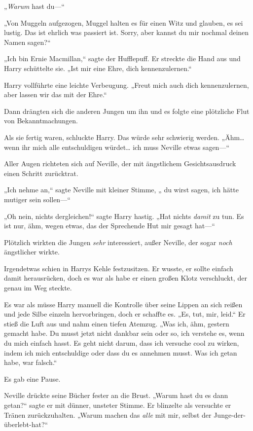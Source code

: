 {„\emph{Warum} hast du—“

„Von Muggeln aufgezogen, Muggel halten es für einen Witz und glauben, es sei lustig. Das ist ehrlich was passiert ist. Sorry, aber kannst du mir nochmal deinen Namen sagen?“

„Ich bin Ernie Macmillan,“ sagte der Hufflepuff. Er streckte die Hand aus und Harry schüttelte sie. „Ist mir eine Ehre, dich kennenzulernen.“

Harry vollführte eine leichte Verbeugung. „Freut mich auch dich kennenzulernen, aber lassen wir das mit der Ehre.“

Dann drängten sich die anderen Jungen um ihn und es folgte eine plötzliche Flut von Bekanntmachungen.

Als sie fertig waren, schluckte Harry. Das würde sehr schwierig werden. „Ähm… wenn ihr mich alle entschuldigen würdet… ich muss Neville etwas sagen—“

Aller Augen richteten sich auf Neville, der mit ängstlichem Gesichtsausdruck einen Schritt zurücktrat.

„Ich nehme an,“ sagte Neville mit kleiner Stimme, „ du wirst sagen, ich hätte mutiger sein sollen—“

„Oh nein, nichts dergleichen!“ sagte Harry hastig. „Hat nichts \emph{damit} zu tun. Es ist nur, ähm, wegen etwas, das der Sprechende Hut mir gesagt hat—“

Plötzlich wirkten die Jungen \emph{sehr} interessiert, außer Neville, der sogar \emph{noch} ängstlicher wirkte.

Irgendetwas schien in Harrys Kehle festzusitzen. Er wusste, er sollte einfach damit herausrücken, doch es war als habe er einen großen Klotz verschluckt, der genau im Weg steckte.

Es war als müsse Harry manuell die Kontrolle über seine Lippen an sich reißen und jede Silbe einzeln hervorbringen, doch er schaffte es. „Es, tut, mir, leid.“ Er stieß die Luft aus und nahm einen tiefen Atemzug. „Was ich, ähm, gestern gemacht habe. Du musst jetzt nicht dankbar sein oder so, ich verstehe es, wenn du mich einfach hasst. Es geht nicht darum, dass ich versuche cool zu wirken, indem ich mich entschuldige oder dass du es annehmen musst. Was ich getan habe, war falsch.“

Es gab eine Pause.

Neville drückte seine Bücher fester an die Brust. „Warum hast du es dann getan?“ sagte er mit dünner, unsteter Stimme. Er blinzelte als versuchte er Tränen zurückzuhalten. „Warum machen das \emph{alle} mit mir, selbst der Junge-der-überlebt-hat?“

}
